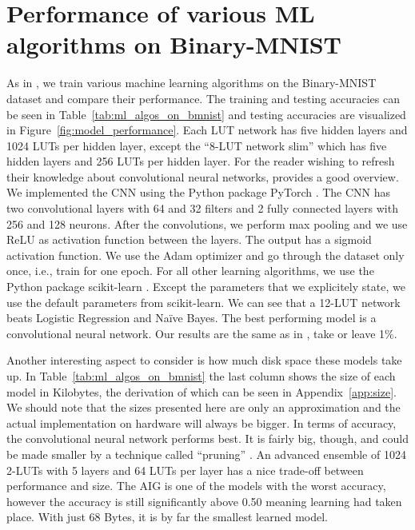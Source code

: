\section{Performance of various ML algorithms on Binary-MNIST} \label{sec:models}
As in \cite{bib:chatterjee2018learning}, we train various machine learning algorithms on the Binary-MNIST dataset and compare their performance. The training and testing accuracies can be seen in Table~\ref{tab:ml_algos_on_bmnist} and testing accuracies are visualized in Figure~\ref{fig:model_performance}. Each LUT network has five hidden layers and 1024 LUTs per hidden layer, except the \enquote{8-LUT network slim} which has five hidden layers and 256 LUTs per hidden layer. For the reader wishing to refresh their knowledge about convolutional neural networks, \cite{bib:yamashita2018convolutional} provides a good overview. We implemented the CNN using the Python package PyTorch \cite{bib:NEURIPS2019-9015}. The CNN has two convolutional layers with 64 and 32 filters and 2 fully connected layers with 256 and 128 neurons. After the convolutions, we perform max pooling and we use ReLU as activation function between the layers. The output has a sigmoid activation function. We use the Adam optimizer and go through the dataset only once, i.e., train for one epoch. For all other learning algorithms, we use the Python package scikit-learn \cite{bib:scikit-learn}. Except the parameters that we explicitely state, we use the default parameters from scikit-learn. We can see that a 12-LUT network beats Logistic Regression and Naïve Bayes. The best performing model is a convolutional neural network. Our results are the same as in \cite{bib:chatterjee2018learning}, take or leave 1\%.

\noindent Another interesting aspect to consider is how much disk space these models take up. In Table~\ref{tab:ml_algos_on_bmnist} the last column shows the size of each model in Kilobytes, the derivation of which can be seen in Appendix~\ref{app:size}. We should note that the sizes presented here are only an approximation and the actual implementation on hardware will always be bigger. In terms of accuracy, the convolutional neural network performs best. It is fairly big, though, and could be made smaller by a technique called \enquote{pruning} \cite{bib:molchanov2016pruning}. An advanced ensemble of 1024 2-LUTs with 5 layers and 64 LUTs per layer has a nice trade-off between performance and size. The AIG is one of the models with the worst accuracy, however the accuracy is still significantly above 0.50 meaning learning had taken place. With just 68 Bytes, it is by far the smallest learned model.

